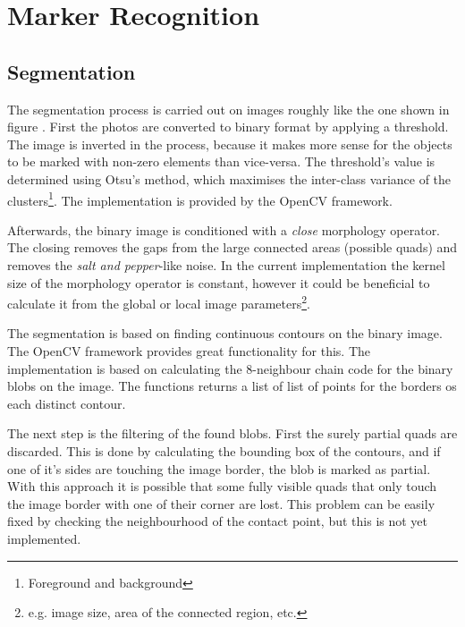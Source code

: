 \chapter{Marker Recognition}\label{sect:marker_recognition}

\section{Segmentation}

The segmentation process is carried out on images roughly like the one shown in figure .
First the photos are converted to binary format by applying a threshold.
The image is inverted in the process, because it makes more sense for the objects to be marked with non-zero elements than vice-versa.
The threshold's value is determined using Otsu's method, which maximises the inter-class variance of the clusters\footnote{Foreground and background}.
The implementation is provided by the OpenCV framework.

Afterwards, the binary image is conditioned with a \emph{close} morphology operator.
The closing removes the gaps from the large connected areas (possible quads) and removes the \emph{salt and pepper}-like noise.
In the current implementation the kernel size of the morphology operator is constant, however it could be beneficial to calculate it from the global or local image parameters\footnote{e.g. image size, area of the connected region, etc.}.

The segmentation is based on finding continuous contours on the binary image.
The OpenCV framework provides great functionality for this.
The implementation is based on calculating the 8-neighbour chain code for the binary blobs on the image.
The functions returns a list of list of points for the borders os each distinct contour.

The next step is the filtering of the found blobs.
First the surely partial quads are discarded.
This is done by calculating the bounding box of the contours, and if one of it's sides are touching the image border, the blob is marked as partial.
With this approach it is possible that some fully visible quads that only touch the image border with one of their corner are lost.
This problem can be easily fixed by checking the neighbourhood of the contact point, but this is not yet implemented.


